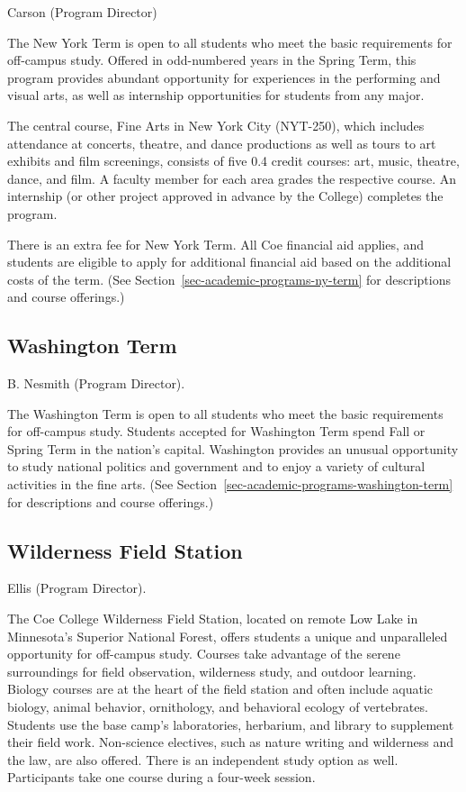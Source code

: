 \documentclass[
  letterpaper,
]{scrbook}
\begin{document}
Carson (Program Director)

The New York Term is open to all students who meet the basic
requirements for off-campus study. Offered in odd-numbered years in the
Spring Term, this program provides abundant opportunity for experiences
in the performing and visual arts, as well as internship opportunities
for students from any major.

The central course, Fine Arts in New York City (NYT-250), which includes
attendance at concerts, theatre, and dance productions as well as tours
to art exhibits and film screenings, consists of five 0.4 credit
courses: art, music, theatre, dance, and film. A faculty member for each
area grades the respective course. An internship (or other project
approved in advance by the College) completes the program.

There is an extra fee for New York Term. All Coe financial aid applies,
and students are eligible to apply for additional financial aid based on
the additional costs of the term. (See
Section~\ref{sec-academic-programs-ny-term} for descriptions and course
offerings.)

\subsection{Washington Term}\label{washington-term}

B. Nesmith (Program Director).

The Washington Term is open to all students who meet the basic
requirements for off-campus study. Students accepted for Washington Term
spend Fall or Spring Term in the nation's capital. Washington provides
an unusual opportunity to study national politics and government and to
enjoy a variety of cultural activities in the fine arts. (See
Section~\ref{sec-academic-programs-washington-term} for descriptions and
course offerings.)

\subsection{Wilderness Field Station}\label{wilderness-field-station}

Ellis (Program Director).

The Coe College Wilderness Field Station, located on remote Low Lake in
Minnesota's Superior National Forest, offers students a unique and
unparalleled opportunity for off-campus study. Courses take advantage of
the serene surroundings for field observation, wilderness study, and
outdoor learning. Biology courses are at the heart of the field station
and often include aquatic biology, animal behavior, ornithology, and
behavioral ecology of vertebrates. Students use the base camp's
laboratories, herbarium, and library to supplement their field work.
Non-science electives, such as nature writing and wilderness and the
law, are also offered. There is an independent study option as well.
Participants take one course during a four-week session.
\end{document}
